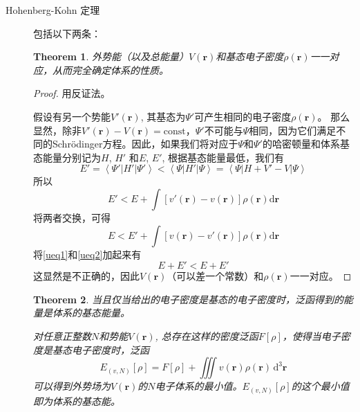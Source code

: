 \documentclass[12pt,a4paper,openany,twoside]{book}
\newtheorem{theorem}{Theorem}[section]
\numberwithin{equation}{section}
\newcommand{\bracketl}[3]{\left\langle #1 \left| #2 \right| #3 \right\rangle}
\newcommand{\sch}{Schr\"odinger}
\newcommand{\ud}{\mathrm{d}}
\begin{document}
\begin{description}
\begin{description}
              \item[Hohenberg-Kohn 定理] 包括以下两条：
                \begin{theorem}
                  外势能（以及总能量）$V(\textbf{r})$和基态电子密度$\rho(\textbf{r})$一一对应，从而完全确定体系的性质。
                \end{theorem}
            
                \begin{proof}
                  用反证法。
                  
                  假设有另一个势能$V'(\textbf{r})$, 其基态为$\Psi'$可产生相同的电子密度$\rho(\textbf{r})$。 那么显然，除非$V'(\textbf{r})-V(\textbf{r})=\mathrm{const}$，$\Psi'$不可能与$\Psi$相同，因为它们满足不同的\sch 方程。因此，如果我们将对应于$\Psi$和$\Psi'$的哈密顿量和体系基态能量分别记为$H$, $H'$ 和$E$, $E'$, 根据基态能量最低，我们有
                  \begin{equation}
                    E'=\bracketl{\Psi'}{H'}{\Psi'}<\bracketl{\Psi}{H'}{\Psi}=\bracketl{\Psi}{H+V'-V}{\Psi}
                  \end{equation}
                  所以
                  \begin{equation}
                    E'<E+\int [v'(\textbf{r})-v(\textbf{r})]\rho(\textbf{r})\ud\textbf{r}
                    \label{ueq1}
                  \end{equation}
                  将两者交换，可得
                  \begin{equation}
                    E<E'+\int [v(\textbf{r})-v'(\textbf{r})]\rho(\textbf{r})\ud\textbf{r}
                    \label{ueq2}
                  \end{equation}
                  将\ref{ueq1}和\ref{ueq2}加起来有
                  \begin{equation}
                    E+E'<E+E'
                  \end{equation}
                  这显然是不正确的，因此$V(\textbf{r})$（可以差一个常数）和$\rho(\textbf{r})$一一对应。
                \end{proof}
            
                \begin{theorem}
                  当且仅当给出的电子密度是基态的电子密度时，泛函得到的能量是体系的基态能量。
                  
                  对任意正整数$N$和势能$V(\textbf{r})$, 总存在这样的密度泛函$F[\rho]$，使得当电子密度是基态电子密度时，泛函
                  \begin{equation}
                    E_{(v,N)}[\rho]=F[\rho]+\iiint v(\textbf{r})\rho(\textbf{r})\,\ud^3\textbf{r}
                  \end{equation}
                  可以得到外势场为$V(\textbf{r})$的$N$电子体系的最小值。$E_{(v,N)}[\rho]$的这个最小值即为体系的基态能。
                \end{theorem}
            

\end{description}
\end{description}
\end{document}
